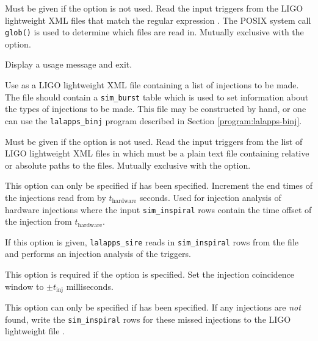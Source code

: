 \begin{entry}
\begin{entry}
\item[\option{--glob}~\parm{globfiles} ]
Must be given if the  option is not used. Read the input triggers from the
LIGO lightweight XML files that match the regular expression
. The POSIX system call \verb$glob()$ is used to determine
which files are read in. Mutually exclusive with the  option.

\item[\option{--help}]
Display a usage message and exit.

\item[\option{--injection-file} \parm{injfile name}]
Use  as a LIGO lightweight XML file containing a list of
injections to be made. The file should contain a \verb+sim_burst+ table
which is used to set information about the types of injections to be made.
This file may be constructed by hand, or one can use the
\verb+lalapps_binj+ program described in Section
\ref{program:lalapps-binj}.   

\item[\option{--input}~\parm{inputfile} ]
Must be given if the  option is not used. Read the input triggers from the list of
LIGO lightweight XML files in  which must be a plain text
file containing relative or absolute paths to the files.  Mutually exclusive
with the  option.

\item[\option{--hardware-injections}~\parm{$t_\mathrm{hardware}$}]
This option can only be specified if  has been specified.
Increment the end times of the injections read from  by
$t_\mathrm{hardware}$ seconds. Used for injection analysis of hardware
injections where the input \verb$sim_inspiral$ rows contain the time offset of
the injection from  $t_\mathrm{hardware}$.

\item[\option{--injection-file} \parm{injfile}] 
If this option is given, \verb$lalapps_sire$ reads in \verb$sim_inspiral$ rows from the file
 and performs an injection analysis of the triggers.

\item[\option{--injection-coincidence} \parm{$t_\mathrm{inj}$}]
This option is required if
the  option is specified. Set the injection
coincidence window to $\pm t_\mathrm{inj}$ milliseconds.

\item[\option{--missed-injections} \parm{file}] 
This option can only be specified if  has been specified. 
If any injections are \emph{not} found, write the \verb$sim_inspiral$ rows for these missed injections to the LIGO lightweight file .


\end{entry}
\end{entry}
